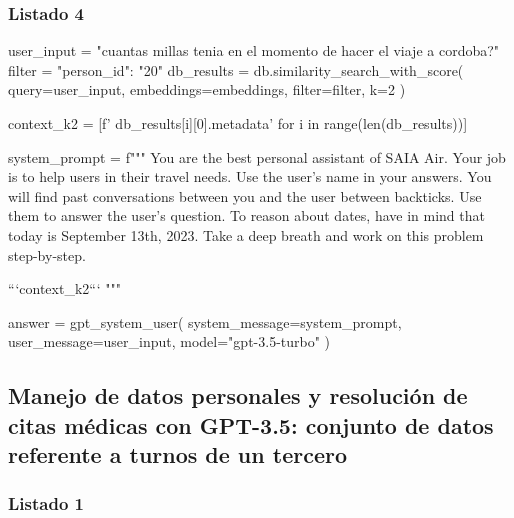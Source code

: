 \subsubsection{Listado 4}
\label{anexo:code-4-1-14-4}

\begin{APACode}
user_input = "cuantas millas tenia en el momento de hacer el viaje a cordoba?"
filter = {"person_id": "20"}
db_results = db.similarity_search_with_score(
    query=user_input, 
    embeddings=embeddings, 
    filter=filter, 
    k=2
)

context_k2 = [f' {db_results[i][0].metadata}\n' 
              for i in range(len(db_results))]

system_prompt = f"""
You are the best personal assistant of SAIA Air. Your job is to help users in their travel needs.
Use the user's name in your answers.
You will find past conversations between you and the user between backticks.
Use them to answer the user's question.
To reason about dates, have in mind that today is September 13th, 2023.
Take a deep breath and work on this problem step-by-step.

```{context_k2}```
"""

answer = gpt_system_user(
    system_message=system_prompt, 
    user_message=user_input, 
    model="gpt-3.5-turbo"
)
\end{APACode}

\subsection{Manejo de datos personales y resolución de citas médicas con GPT-3.5: conjunto de datos referente a turnos de un tercero}

\subsubsection{Listado 1}
\label{anexo:code-4-1-15-1}

